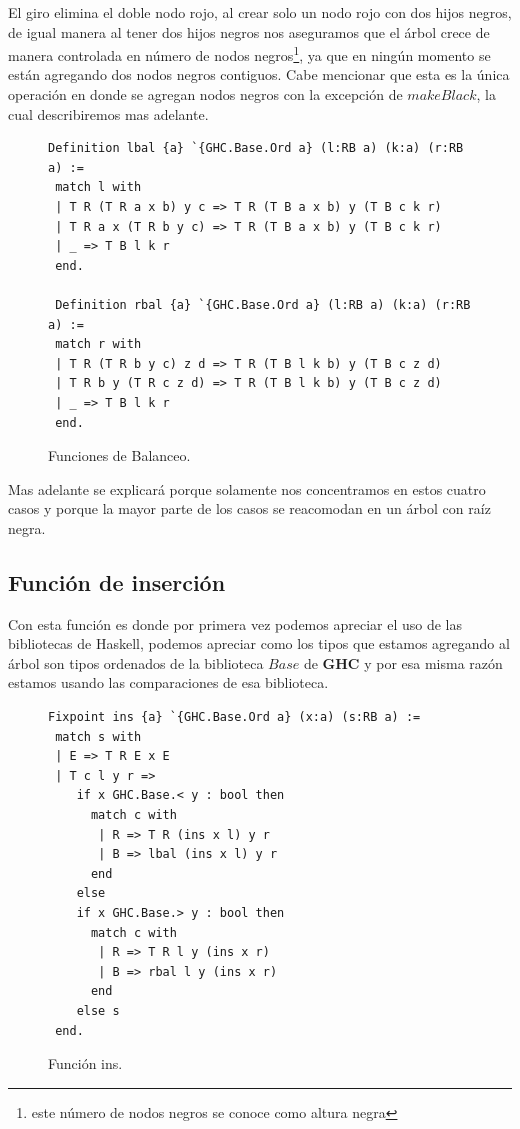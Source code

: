 \documentclass[8pt,leqno,pdflatex,spanish]{book}
\theoremstyle{plain}
\theoremstyle{definition}
\theoremstyle{remark}
\begin{document}
El giro elimina el doble nodo rojo, al crear solo un nodo rojo con dos hijos negros, de igual 
manera al tener dos hijos negros nos aseguramos que el árbol crece de manera controlada en 
n\'umero de nodos negros\footnote{este n\'umero de nodos negros se conoce como altura negra}, ya 
que en ningún momento se están agregando dos nodos negros contiguos. Cabe mencionar que esta es la 
única operación en donde se agregan nodos negros con la excepción de $makeBlack$, la cual 
describiremos mas adelante.
\begin{figure}
\centering 
\captionsetup{justification=centering}
\begin{verbatim}
Definition lbal {a} `{GHC.Base.Ord a} (l:RB a) (k:a) (r:RB a) :=
 match l with
 | T R (T R a x b) y c => T R (T B a x b) y (T B c k r)
 | T R a x (T R b y c) => T R (T B a x b) y (T B c k r)
 | _ => T B l k r
 end.

 Definition rbal {a} `{GHC.Base.Ord a} (l:RB a) (k:a) (r:RB a) :=
 match r with
 | T R (T R b y c) z d => T R (T B l k b) y (T B c z d)
 | T R b y (T R c z d) => T R (T B l k b) y (T B c z d)
 | _ => T B l k r
 end.
\end{verbatim}
\caption{Funciones de Balanceo.}
\end{figure}

Mas adelante se explicar\'a porque solamente nos concentramos en estos cuatro casos y porque la 
mayor parte de los casos se reacomodan en un \'arbol con ra\'iz negra.

\subsection {Funci\'on de inserci\'on}
Con esta funci\'on es donde por primera vez podemos apreciar el uso de las  bibliotecas de 
Haskell, podemos apreciar como los tipos que estamos agregando al \'arbol son tipos ordenados de 
la biblioteca $Base$ de \textbf{GHC} y por esa misma raz\'on estamos usando las comparaciones de 
esa biblioteca.
\begin{figure}
\centering 
\captionsetup{justification=centering}
\begin{verbatim}
Fixpoint ins {a} `{GHC.Base.Ord a} (x:a) (s:RB a) :=
 match s with
 | E => T R E x E
 | T c l y r =>
    if x GHC.Base.< y : bool then 
      match c with
       | R => T R (ins x l) y r
       | B => lbal (ins x l) y r
      end
    else 
    if x GHC.Base.> y : bool then 
      match c with
       | R => T R l y (ins x r)
       | B => rbal l y (ins x r)
      end
    else s
 end.
\end{verbatim}
\caption{Funci\'on ins.}
\end{figure}
\end{document}

